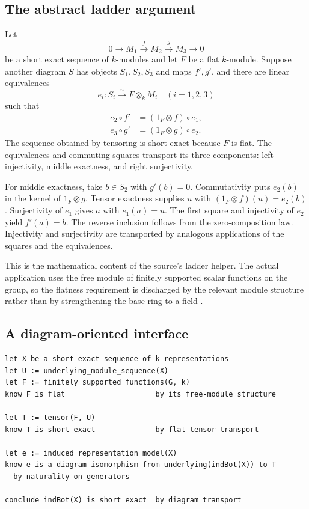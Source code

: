 \documentclass[11pt,a4paper]{article}
\theoremstyle{plain}
\theoremstyle{definition}
\theoremstyle{remark}
\begin{document}
\subsection{The abstract ladder argument}
Let
\[
 0\longrightarrow M_1\xrightarrow{f}M_2\xrightarrow{g}M_3
 \longrightarrow0
\]
be a short exact sequence of $k$-modules and let $F$ be a flat $k$-module.
Suppose another diagram $S$ has objects $S_1,S_2,S_3$ and maps $f',g'$,
and there are linear equivalences
\[
 e_i:S_i\overset{\sim}{\longrightarrow}F\otimes_k M_i
 \quad(i=1,2,3)
\]
such that
\begin{align*}
 e_2\circ f'&=(1_F\otimes f)\circ e_1,\\
 e_3\circ g'&=(1_F\otimes g)\circ e_2.
\end{align*}
The sequence obtained by tensoring is short exact because $F$ is flat. The
equivalences and commuting squares transport its three components: left
injectivity, middle exactness, and right surjectivity.

For middle exactness, take $b\in S_2$ with $g'(b)=0$. Commutativity puts
$e_2(b)$ in the kernel of $1_F\otimes g$. Tensor exactness supplies $u$ with
$(1_F\otimes f)(u)=e_2(b)$. Surjectivity of $e_1$ gives $a$ with $e_1(a)=u$.
The first square and injectivity of $e_2$ yield $f'(a)=b$. The reverse inclusion
follows from the zero-composition law. Injectivity and surjectivity are
transported by analogous applications of the squares and the equivalences.

This is the mathematical content of the source's ladder helper. The actual
application uses the free module of finitely supported scalar functions on
the group, so the flatness requirement is discharged by the relevant module
structure rather than by strengthening the base ring to a field
\cite{exactsource}.

\subsection{A diagram-oriented interface}
\par\noindent\begin{minipage}{\linewidth}
\begin{lstlisting}
let X be a short exact sequence of k-representations
let U := underlying_module_sequence(X)
let F := finitely_supported_functions(G, k)
know F is flat                     by its free-module structure

let T := tensor(F, U)
know T is short exact              by flat tensor transport

let e := induced_representation_model(X)
know e is a diagram isomorphism from underlying(indBot(X)) to T
  by naturality on generators

conclude indBot(X) is short exact  by diagram transport
\end{lstlisting}
\end{minipage}\par
\end{document}
